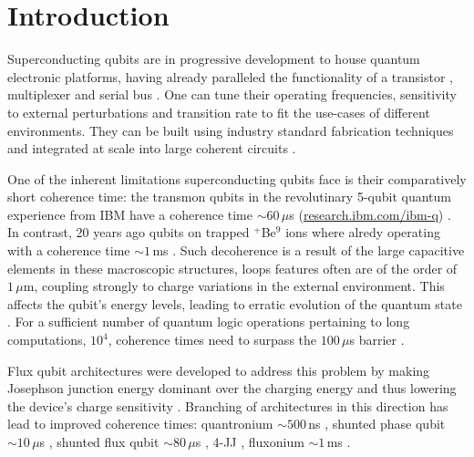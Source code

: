 
\section{Introduction}
 
\noindent Superconducting qubits are in progressive development to house quantum electronic platforms, having already paralleled
the functionality of a transistor \cite{Astafiev2010}\cite{hoi2011}, multiplexer \cite{honigl2018} and serial bus
\cite{shen2005}. One can tune their operating frequencies, sensitivity to external perturbations and transition rate to fit the
use-cases of different environments. They can be built using industry standard fabrication techniques and integrated at scale into
large coherent circuits \cite{johnson2010}.
 
One of the inherent limitations superconducting qubits face is their comparatively short coherence time: the transmon qubits in
the revolutinary 5-qubit quantum experience from IBM have a coherence time $ \sim 60\,\mu $s
(\href{http://www.research.ibm.com/ibm-q}{research.ibm.com/ibm-q}) \cite{linke2017}. In contrast, 20 years ago qubits on trapped
$ ^{+} $Be$ ^{9} $ ions where alredy operating with a coherence time $\sim1\, $ms \cite{monroe1995}. Such decoherence is a result of
the large capacitive elements in these macroscopic structures, loops features often are of the order of
$1\,\mu\text{m}$\cite{Astafiev2010}\cite{hoi2011}\cite{johnson2010}, coupling strongly to charge variations in the external environment. This %
affects the qubit's energy levels, leading to erratic evolution of the quantum state \cite{devoret2008}. For a sufficient number
of quantum logic operations pertaining to long computations, $ 10^{4} $, coherence times need to surpass the $ 100\,\mu$s barrier
\cite{orlando1999}.
 
Flux qubit architectures were developed to address this problem by making Josephson junction energy dominant over the charging
energy and thus lowering the device's charge sensitivity \cite{orlando1999}\cite{chiorescu2003}\cite{mooij1999}. Branching of
architectures in this direction has lead to improved coherence times: quantronium $\sim500\,$ns \cite{cottet2002} \cite{gu2017},
shunted phase qubit $\sim10\,\mu $s \cite{stern2014} , shunted flux qubit $\sim80\,\mu$s \cite{yan2016} , 4-JJ \cite{qui2016}, fluxonium $\sim1\,$ms \cite{pop2014}.
 
